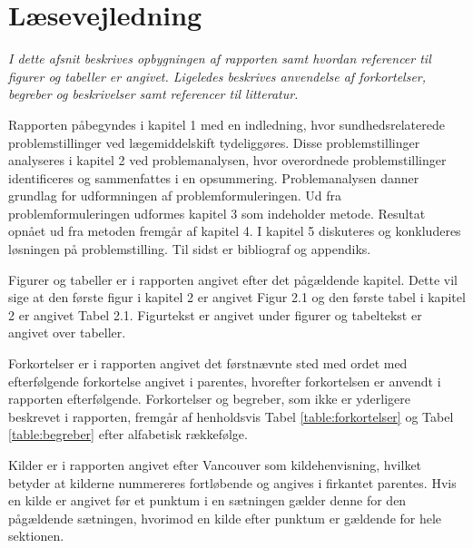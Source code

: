 \section*{Læsevejledning}
\textit{I dette afsnit beskrives opbygningen af rapporten samt hvordan referencer til figurer og tabeller er angivet. Ligeledes beskrives anvendelse af forkortelser, begreber og beskrivelser samt referencer til litteratur.}

Rapporten påbegyndes i kapitel 1 med en indledning, hvor sundhedsrelaterede problemstillinger ved lægemiddelskift tydeliggøres. Disse problemstillinger analyseres i kapitel 2 ved problemanalysen, hvor overordnede problemstillinger identificeres og sammenfattes i en opsummering. Problemanalysen danner grundlag for udformningen af problemformuleringen. Ud fra problemformuleringen udformes kapitel 3 som indeholder metode.  Resultat opnået ud fra metoden fremgår af kapitel 4. I kapitel 5 diskuteres og konkluderes løsningen på problemstilling. Til sidst er bibliograf og appendiks.

Figurer og tabeller er i rapporten angivet efter det pågældende kapitel. Dette vil sige at den første figur i kapitel 2 er angivet Figur 2.1 og den første tabel i kapitel 2 er angivet Tabel 2.1. Figurtekst er angivet under figurer og tabeltekst er angivet over tabeller. 

Forkortelser er i rapporten angivet det førstnævnte sted med ordet med efterfølgende forkortelse angivet i parentes, hvorefter forkortelsen er anvendt i rapporten efterfølgende. Forkortelser og begreber, som ikke er yderligere beskrevet i rapporten, fremgår af henholdsvis Tabel \ref{table:forkortelser} og Tabel \ref{table:begreber} efter alfabetisk rækkefølge.

Kilder er i rapporten angivet efter Vancouver som kildehenvisning, hvilket betyder at kilderne nummereres fortløbende og angives i firkantet parentes. Hvis en kilde er angivet før et punktum i en sætningen gælder denne for den pågældende sætningen, hvorimod en kilde efter punktum er gældende for hele sektionen.


